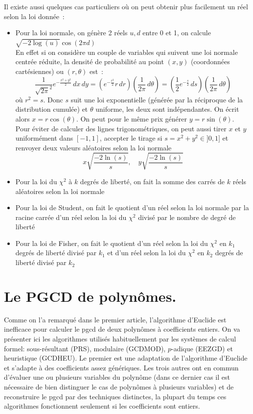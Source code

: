 \documentclass[a4paper,11pt]{article}
\begin{document}
\begin{giacjshere}
Il existe aussi quelques cas particuliers o\`u
on peut obtenir plus facilement un r\'eel selon la loi
donn\'ee~:
\begin{itemize}
\item Pour la loi normale, on g\'en\`ere 2 r\'eels $u,d$
entre 0 et 1, on calcule \\
$\sqrt{-2 \log(u)} \cos(2\pi d)$\\
En effet si on considère un couple de variables qui
suivent une loi normale centrée réduite, la densité de probabilité
au point $(x,y)$ (coordonnées cartésiennes) ou $(r,\theta)$ est~:
$$ \frac{1}{\sqrt{2\pi}^2} e^{-\frac{x^2+y^2}{2}} \, dx \, dy
=  \left( e^{-\frac{r^2}{2}} r  \, dr \right)
\left( \frac{1}{2\pi} \, d\theta \right)
= \left( \frac{1}{2} e^{-\frac s2} \, ds \right)
\left( \frac{1}{2\pi} \, d\theta \right)$$
où $r^2=s$. Donc $s$ suit une loi exponentielle (générée
par la réciproque de la distribution cumulée) et $\theta$
uniforme, les deux sont indépendantes. On écrit 
alors $x=r\cos(\theta)$. On peut pour le même prix
générer $y=r\sin(\theta)$. \\
Pour éviter de calculer
des lignes trigonométriques, on peut aussi tirer
$x$ et $y$ uniformément dans $[-1,1]$, accepter le tirage
si $s=x^2+y^2 \in ]0,1]$ et renvoyer deux valeurs
aléatoires selon la loi normale
$$ x \sqrt{\frac{-2\ln(s)}{s}}, \quad y \sqrt{\frac{-2\ln(s)}{s}} $$
\item Pour la loi du $\chi^2$ \`a $k$ degr\'es de libert\'e, 
on fait la somme
des carr\'es de $k$ r\'eels al\'eatoires selon la loi normale
\item Pour la loi de Student, on fait le quotient d'un réel
selon la loi normale par la racine carrée
d'un réel selon la loi du $\chi^2$ divisé par le nombre
de degré de liberté
\item Pour la loi de Fisher, on fait le quotient d'un réel
selon la loi du $\chi^2$ en $k_1$ degrés de liberté divisé par
$k_1$ et d'un réel
selon la loi du $\chi^2$ en $k_2$ degrés de liberté divisé par
$k_2$
\end{itemize}

\section{Le PGCD de polynômes.} \label{sec:pgcd} 
Comme on l'a remarqué dans le premier article, l'algorithme d'Euclide est
inefficace pour calculer le pgcd de deux polynômes à coefficients entiers. On
va présenter ici les algorithmes utilisés habituellement par les systèmes de
calcul formel: sous-résultant (PRS), modulaire (GCDMOD), $p$-adique (EEZGD) et
heuristique (GCDHEU). Le premier est une adaptation de l'algorithme d'Euclide
et s'adapte à des coefficients assez génériques. Les trois autres ont en
commun d'évaluer une ou plusieurs variables du polynôme (dans ce dernier cas
il est nécessaire de bien distinguer le cas de polynômes à plusieurs
variables) et de reconstruire le pgcd par des techniques distinctes, la
plupart du temps ces algorithmes fonctionnent seulement si les coefficients
sont entiers.


\end{giacjshere}
\end{document}
